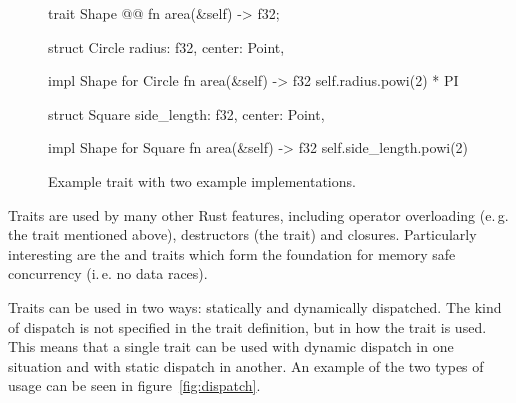 \begin{figure}[t]
  \centering
  \begin{minipage}{.65\textwidth}
    \begin{rustcode}
    trait Shape {@@
        fn area(&self) -> f32;
    }
    \end{rustcode}
    \end{minipage}

    \vspace{3mm}

    \begin{minipage}[t]{.49\textwidth}
    \begin{rustcode}
    struct Circle {
        radius: f32,
        center: Point,
    }

    impl Shape for Circle {
        fn area(&self) -> f32 {
            self.radius.powi(2) * PI
        }
    }
    \end{rustcode}
  \end{minipage}
  \begin{minipage}[t]{.49\textwidth}
    \begin{rustcode}
    struct Square {
        side_length: f32,
        center: Point,
    }

    impl Shape for Square {
        fn area(&self) -> f32 {
            self.side_length.powi(2)
        }
    }
    \end{rustcode}
  \end{minipage}
  \caption{Example trait with two example implementations.}
  \label{fig:shapes}
\end{figure}

Traits are used by many other Rust features, including operator overloading (e.\,g. the  trait mentioned above), destructors (the  trait) and closures.
Particularly interesting are the  and  traits which form the foundation for memory safe concurrency (i.\,e. no data races).

Traits can be used in two ways: statically and dynamically dispatched.
The kind of dispatch is not specified in the trait definition, but in how the trait is used.
This means that a single trait can be used with dynamic dispatch in one situation and with static dispatch in another.
An example of the two types of usage can be seen in figure~\ref{fig:dispatch}.

